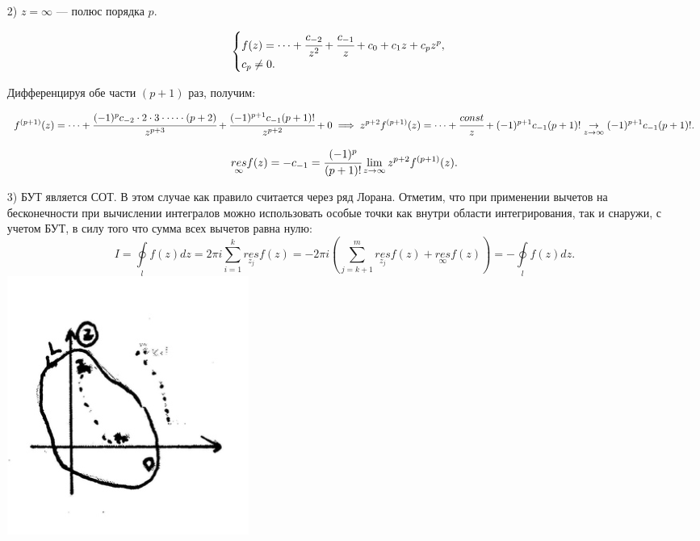 \documentclass[../../main.tex]{subfiles}
\begin{document}
\begin{itemize}
\begin{itemize}
	 	\item[2)]
	 	$z=\infty$ --- полюс порядка $p$.
	 	
	 	\[
	 	\begin{cases}
	 	f(z)=\dots+\cfrac{c_{-2}}{z^2}+\cfrac{c_{-1}}{z}+c_0+c_1z+c_pz^p,\\
	 	c_p\neq0.
	 	\end{cases}
	 	\]
	 	
	 	Дифференцируя обе части $(p+1)$ раз, получим:
	 	
	 	\[
	 	f^{(p+1)}(z)=\dots+\cfrac{(-1)^{p}c_{-2}\cdot2\cdot3\cdot\dots \cdot(p+2)}{z^{p+3}}+\cfrac{(-1)^{p+1}c_{-1}(p+1)!}{z^{p+2}}+0\implies
	 	z^{p+2}f^{(p+1)}(z)=\dots+\cfrac{const}{z}+(-1)^{p+1}c_{-1}(p+1)! \underset{z\rightarrow \infty}{\rightarrow}(-1)^{p+1}c_{-1}(p+1)!.
	 	\]
	 	
	 	\begin{equation}
	 	\underset{\infty}{res}f(z)=-c_{-1}=\cfrac{(-1)^p}{(p+1)!} \lim\limits_{z\rightarrow\infty}z^{p+2}f^{(p+1)}(z).
	 	\end{equation}
	 	
	 	\item[3)] 
	 	БУТ является СОТ. В этом случае как правило считается через ряд Лорана. Отметим, что при применении вычетов на бесконечности при вычислении интегралов можно использовать особые точки как внутри области интегрирования, так и снаружи, с учетом БУТ, в силу того что сумма всех вычетов равна нулю:
	 	\[
	 	I=\oint\limits_lf(z)dz=2\pi i \sum_{i=1}^{k}\underset{z_j}{res}f(z)=-2\pi i\left(\sum_{j=k+1}^{m}\underset{z_j}{res}f(z)+\underset{\infty}{res}f(z)
	 	\right)=-\oint\limits_lf(z)dz.
	 	\]
	 	\includegraphics{lec_27}
	 \end{itemize}
	 \end{itemize}
\end{document}
